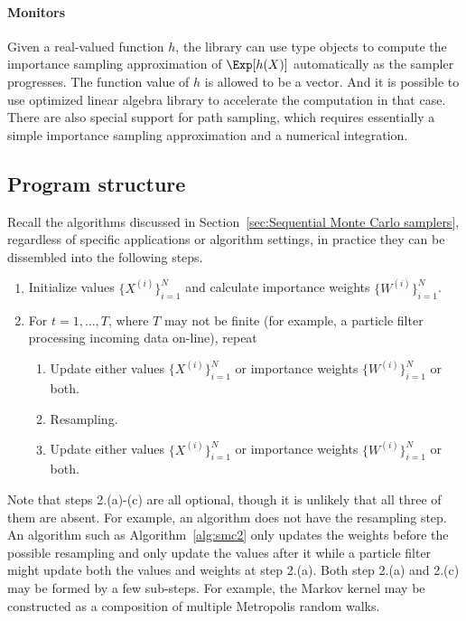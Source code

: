 \paragraph{Monitors}

Given a real-valued function $h$, the library can use 
type objects to compute the importance sampling approximation of $\Exp[h(X)]$
automatically as the sampler progresses. The function value of $h$ is allowed
to be a vector. And it is possible to use optimized linear algebra library to
accelerate the computation in that case. There are also special support for
path sampling, which requires essentially a simple importance sampling
approximation and a numerical integration.

\subsection{Program structure}
\label{sub:Program structure}

Recall the \smc algorithms discussed in Section~\ref{sec:Sequential Monte
  Carlo samplers}, regardless of specific applications or algorithm settings,
in practice they can be dissembled into the following steps.
\begin{enumerate}
  \item Initialize values $\{X^{(i)}\}_{i=1}^N$ and calculate importance
    weights $\{W^{(i)}\}_{i=1}^N$.
  \item For $t = 1,\dots,T$, where $T$ may not be finite (for example, a
    particle filter processing incoming data on-line), repeat
    \begin{enumerate}
      \item Update either values $\{X^{(i)}\}_{i=1}^N$ or importance weights
        $\{W^{(i)}\}_{i=1}^N$ or both.
      \item Resampling.
      \item Update either values $\{X^{(i)}\}_{i=1}^N$ or importance weights
        $\{W^{(i)}\}_{i=1}^N$ or both.
    \end{enumerate}
\end{enumerate}
Note that steps 2.(a)-(c) are all optional, though it is unlikely that all
three of them are absent. For example, an \ais algorithm does not have the
resampling step. An \smc algorithm such as Algorithm~\ref{alg:smc2} only
updates the weights before the possible resampling and only update the values
after it while a particle filter might update both the values and weights at
step 2.(a). Both step 2.(a) and 2.(c) may be formed by a few sub-steps. For
example, the Markov kernel may be constructed as a composition of multiple
Metropolis random walks.

